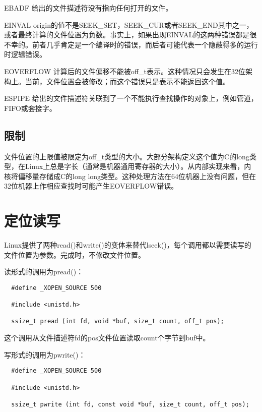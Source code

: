 \begin{eqlist*}
\item [EBADF]
给出的文件描述符没有指向任何打开的文件。
\item [EINVAL]
origin的值不是SEEK\_SET，SEEK\_CUR或者SEEK\_END其中之一，或者最终计算的文件位置为负数。事实上，如果出现EINVAL的这两种错误都是很不幸的。前者几乎肯定是一个编译时的错误，而后者可能代表一个隐蔽得多的运行时逻辑错误。
\item [EOVERFLOW]
计算后的文件偏移不能被off\_t表示。这种情况只会发生在32位架构上。当前，文件位置会被修改；而这个错误只是表示不能返回这个值。
\item [ESPIPE]
给出的文件描述符关联到了一个不能执行查找操作的对象上，例如管道，FIFO或套接字。
\end{eqlist*}

\subsection{限制}

文件位置的上限值被限定为off\_t类型的大小。大部分架构定义这个值为C的long类型，在Linux上总是字长（通常是机器通用寄存器的大小）。从内部实现来看，内核将偏移量存储成C的long long类型。这种处理方法在64位机器上没有问题，但在32位机器上作相应查找时可能产生EOVERFLOW错误。 

\section{定位读写}

Linux提供了两种read()和write()的变体来替代lseek()，每个调用都以需要读写的文件位置为参数。完成时，不修改文件位置。

读形式的调用为pread()：

\begin{lstlisting}
  #define _XOPEN_SOURCE 500

  #include <unistd.h>

  ssize_t pread (int fd, void *buf, size_t count, off_t pos);
\end{lstlisting}

这个调用从文件描述符fd的pos文件位置读取count个字节到buf中。

写形式的调用为pwrite()：

\begin{lstlisting}
  #define _XOPEN_SOURCE 500

  #include <unistd.h>

  ssize_t pwrite (int fd, const void *buf, size_t count, off_t pos);
\end{lstlisting}

